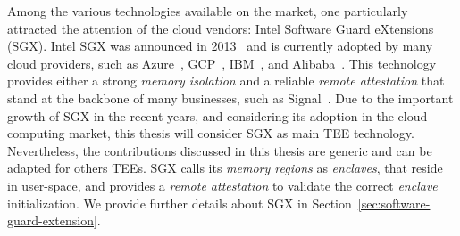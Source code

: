 Among the various technologies available on the market, one particularly 
attracted the attention of the cloud vendors: Intel Software Guard eXtensions 
(SGX).
Intel SGX was announced in 2013~\citep{rozas2013intel} and is currently 
adopted 
by many cloud providers, such as Azure~\citep{azure}, 
GCP~\citep{challita2018precise}, IBM~\citep{IBM}, and 
Alibaba~\citep{alibabasgx}.
This technology provides either a strong \emph{memory isolation} and a 
reliable 
\emph{remote attestation} that stand at the backbone of many businesses, such 
as Signal~\citep{signal}.
Due to the important growth of SGX in the recent years, and considering its 
adoption in the cloud computing market, this thesis will consider SGX as main 
TEE technology.
Nevertheless, the contributions discussed in this thesis are generic and can be 
adapted for others TEEs.
SGX calls its \emph{memory regions} as \emph{enclaves}, that reside in 
user-space, and provides a \emph{remote attestation} to validate the correct 
\emph{enclave} initialization.
We provide further details about SGX in 
Section~\ref{sec:software-guard-extension}.


